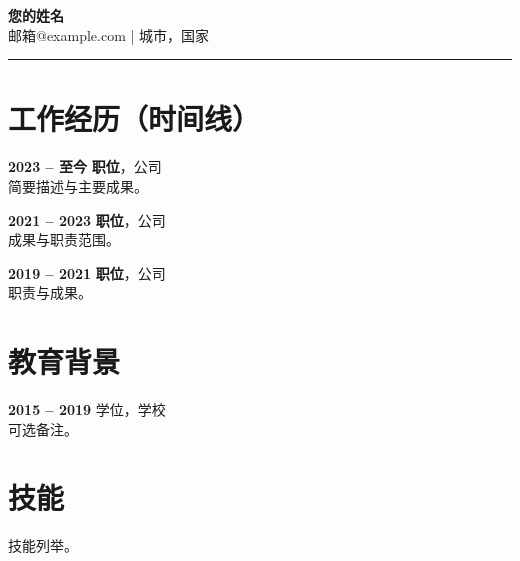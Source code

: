 \documentclass[11pt,a4paper]{article}
\begin{document}
\begin{center}
{\LARGE \textbf{您的姓名}}\\[0.2em]
邮箱@example.com \quad | \quad 城市，国家
\end{center}
\begin{flushright}\rule{2cm}{2.5cm}\end{flushright}
\vspace{0.6em}
\section*{工作经历（时间线）}

\textbf{2023 -- 至今} \quad \textbf{职位}，公司 \\
简要描述与主要成果。

\vspace{0.3em}
\textbf{2021 -- 2023} \quad \textbf{职位}，公司 \\
成果与职责范围。

\vspace{0.3em}
\textbf{2019 -- 2021} \quad \textbf{职位}，公司 \\
职责与成果。

\vspace{0.5em}
\section*{教育背景}
\textbf{2015 -- 2019} \quad 学位，学校 \\
可选备注。

\section*{技能}
技能列举。
\end{document}
